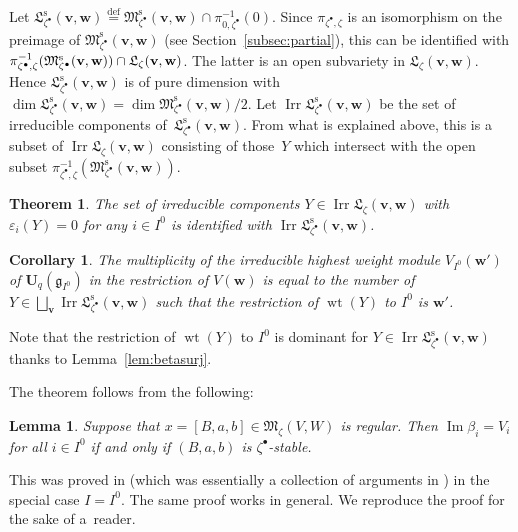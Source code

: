 \documentclass[pdftex]{sigma}
\newtheorem{Theorem}[equation]{Theorem}
\newtheorem{Corollary}[equation]{Corollary}
\newtheorem{Lemma}[equation]{Lemma}
\theoremstyle{definition}
\numberwithin{equation}{section}
\newcommand{\subsecref}[1]{Section~\ref{#1}}
\newcommand{\defeq}{\overset{\operatorname{\scriptstyle def}}{=}}
\newcommand{\Ima}{\operatorname{Im}}
\newcommand{\M}{{\mathfrak M}} %
\newcommand{\Mreg}{\M^{\operatorname{s}}}
\newcommand{\La}{{\mathfrak L}} %
\newcommand{\bv}{{\mathbf v}} %
\newcommand{\bw}{{\mathbf w}} %
\newcommand{\Un}{{\mathbf U}_q}
\newcommand{\Irr}{\operatorname{Irr}}
\newcommand{\Lareg}{\mathfrak L^{\operatorname{s}}}
\begin{document}
Let
\(
   \Lareg_{\zeta^\bullet}(\bv,\bw) \defeq
   \Mreg_{\zeta^\bullet}(\bv,\bw) \cap \pi_{0,\zeta^\bullet}^{-1}(0).
\)
Since $\pi_{\zeta^\bullet,\zeta}$ is an isomorphism on the preimage of
$\Mreg_{\zeta^\bullet}(\bv,\bw)$ (see \subsecref{subsec:partial}),
this can be identif\/ied with
$\pi_{\zeta^\bullet,\zeta}^{-1}(\Mreg_{\zeta^\bullet}(\bv,\bw))\linebreak[2]
\cap\La_\zeta(\bv,\bw)$. The latter is an open subvariety in
$\La_\zeta(\bv,\bw)$. Hence $\Lareg_{\zeta^\bullet}(\bv,\bw)$ is
of pure dimension with $\dim \Lareg_{\zeta^\bullet}(\bv,\bw)
= \dim \Mreg_{\zeta^\bullet}(\bv,\bw)/2$.
Let
\(
   \Irr \Lareg_{\zeta^\bullet}(\bv,\bw)
\)
be the set of irreducible components of~$\Lareg_{\zeta^\bullet}(\bv,\bw)$.
From what is explained above, this is a subset of
$\Irr\La_\zeta(\bv,\bw)$ consisting of those~$Y$ which intersect with the
open subset $\pi_{\zeta^\bullet,\zeta}^{-1}(\Mreg_{\zeta^\bullet}(\bv,\bw))$.

\begin{Theorem}\label{thm:mult_crystal}
  The set of irreducible components $Y\in\Irr\La_\zeta(\bv,\bw)$ with
  $\varepsilon_i(Y) = 0$ for any $i\in I^0$ is identified with
  $\Irr\Lareg_{\zeta^\bullet}(\bv,\bw)$.
\end{Theorem}

\begin{Corollary}
  The multiplicity of the irreducible highest weight module
  $V_{I^0}(\bw')$ of $\Un(\mathfrak g_{I^0})$ in the restriction of
  $V(\bw)$ is equal to the number of
  $Y\in\bigsqcup_{\bv}
  \Irr\Lareg_{\zeta^\bullet}(\bv,\bw)$ such that the restriction of
  $\operatorname{wt}(Y)$ to $I^0$ is $\bw'$.
\end{Corollary}

Note that the restriction of $\operatorname{wt}(Y)$ to $I^0$ is
dominant for $Y\in\Irr\Lareg_{\zeta^\bullet}(\bv,\bw)$ thanks to Lem\-ma~\ref{lem:betasurj}.

The theorem follows from the following:

\begin{Lemma}
  Suppose that $x = [B,a,b]\in \M_\zeta(V,W)$ is regular. Then $\Ima
  \beta_i = V_i$ for all $i\in I^0$ if and only if $(B,a,b)$ is
  $\zeta^\bullet$-stable.
\end{Lemma}

This was proved in \cite[2.9.4]{Na-qaff} (which was essentially a
collection of arguments in \cite{Na-alg}) in the special case $I =
I^0$. The same proof works in general. We reproduce the proof for the
sake of a~reader.
\end{document}
